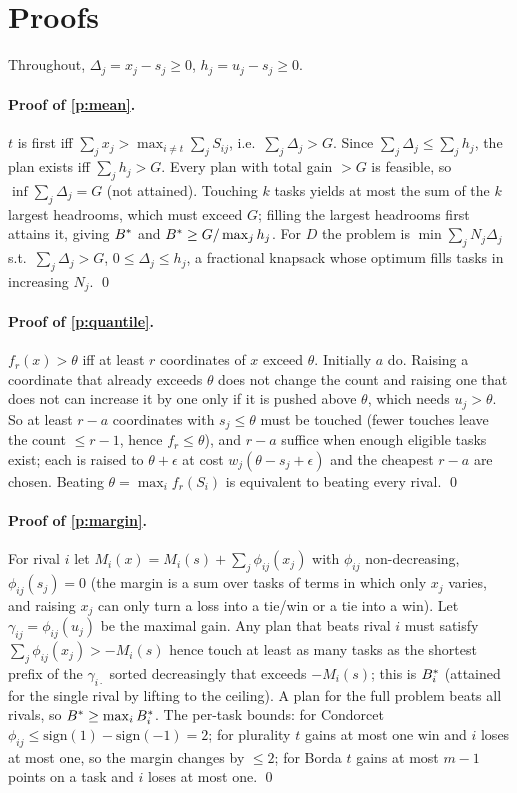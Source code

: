 \section{Proofs}\label{app:proofs}
Throughout, $\Delta_j=x_j-s_j\ge0$, $h_j=u_j-s_j\ge0$.

\paragraph{Proof of \cref{p:mean}.}
$t$ is first iff $\sum_jx_j>\max_{i\ne t}\sum_jS_{ij}$, i.e.\ $\sum_j\Delta_j>G$. Since $\sum_j\Delta_j\le\sum_jh_j$, the plan exists iff $\sum_jh_j>G$. Every plan with total gain $>G$ is feasible, so $\inf\sum_j\Delta_j=G$ (not attained). Touching $k$ tasks yields at most the sum of the $k$ largest headrooms, which must exceed $G$; filling the largest headrooms first attains it, giving $B^{\ast}$ and $B^{\ast}\ge G/\max_jh_j$. For $D$ the problem is $\min\sum_jN_j\Delta_j$ s.t.\ $\sum_j\Delta_j>G$, $0\le\Delta_j\le h_j$, a fractional knapsack whose optimum fills tasks in increasing $N_j$. \qed

\paragraph{Proof of \cref{p:quantile}.}
$f_r(x)>\theta$ iff at least $r$ coordinates of $x$ exceed $\theta$. Initially $a$ do. Raising a coordinate that already exceeds $\theta$ does not change the count and raising one that does not can increase it by one only if it is pushed above $\theta$, which needs $u_j>\theta$. So at least $r-a$ coordinates with $s_j\le\theta$ must be touched (fewer touches leave the count $\le r-1$, hence $f_r\le\theta$), and $r-a$ suffice when enough eligible tasks exist; each is raised to $\theta+\epsilon$ at cost $w_j(\theta-s_j+\epsilon)$ and the cheapest $r-a$ are chosen. Beating $\theta=\max_i f_r(S_i)$ is equivalent to beating every rival. \qed

\paragraph{Proof of \cref{p:margin}.}
For rival $i$ let $M_i(x)=M_i(s)+\sum_j\phi_{ij}(x_j)$ with $\phi_{ij}$ non-decreasing, $\phi_{ij}(s_j)=0$ (the margin is a sum over tasks of terms in which only $x_j$ varies, and raising $x_j$ can only turn a loss into a tie/win or a tie into a win). Let $\gamma_{ij}=\phi_{ij}(u_j)$ be the maximal gain. Any plan that beats rival $i$ must satisfy $\sum_j\phi_{ij}(x_j)>-M_i(s)$ hence touch at least as many tasks as the shortest prefix of the $\gamma_{i\cdot}$ sorted decreasingly that exceeds $-M_i(s)$; this is $B^{\ast}_i$ (attained for the single rival by lifting to the ceiling). A plan for the full problem beats all rivals, so $B^{\ast}\ge\max_iB^{\ast}_i$. The per-task bounds: for Condorcet $\phi_{ij}\le\mathrm{sign}(1)-\mathrm{sign}(-1)=2$; for plurality $t$ gains at most one win and $i$ loses at most one, so the margin changes by $\le2$; for Borda $t$ gains at most $m-1$ points on a task and $i$ loses at most one. \qed

